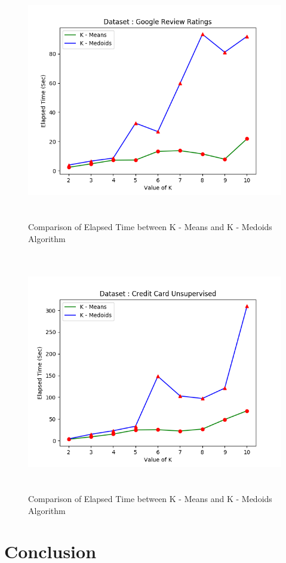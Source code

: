 \documentclass[12pt]{article}
\begin{document}
\begin{figure}[H]
	\centering
	\includegraphics[width = \linewidth, height = 10.5cm]{Google.png}
	\caption{Comparison of Elapsed Time between K - Means and K - Medoids Algorithm}
	\label{fig:google}
\end{figure}

\begin{figure}[H]
	\centering
	\includegraphics[width = \linewidth, height = 10.5cm]{CreditCard.png}
	\caption{Comparison of Elapsed Time between K - Means and K - Medoids Algorithm}
	\label{fig:credit}
\end{figure}



\section{Conclusion}
\end{document}

